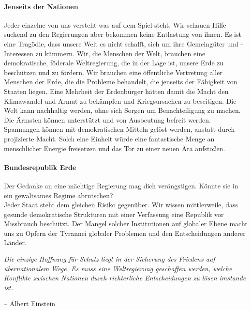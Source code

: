 \documentclass[11pt,a4paper]{article}
\begin{document}
\begin{multicols}{2}

\paragraph{Jenseits der Nationen} 

Jeder einzelne von uns versteht was auf dem Spiel steht.
Wir schauen Hilfe suchend zu den Regierungen aber bekommen keine Entlastung von ihnen.
Es ist eine Tragödie, dass unsere Welt es nicht schafft, sich um ihre Gemeingüter und -Interessen zu kümmern.
Wir, die Menschen der Welt, brauchen eine demokratische, föderale Weltregierung, die in der Lage ist, unsere Erde zu beschützen und zu fördern.
\noindent Wir brauchen eine öffentliche Vertretung aller Menschen der Erde, die die Probleme behandelt, die jenseits der Fähigkeit von Staaten liegen.
Eine Mehrheit der Erdenbürger hätten damit die Macht den Klimawandel und Armut zu bekämpfen und Kriegsursachen zu beseitigen.
Die Welt kann nachhaltig werden, ohne sich Sorgen um Benachteiligung zu machen.
Die Ärmsten können unterstützt und von Ausbeutung befreit werden.
Spannungen können mit demokratischen Mitteln gelöst werden, anstatt durch projizierte Macht.
Solch eine Einheit würde eine fantastische Menge an menschlicher Energie freisetzen und das Tor zu einer neuen Ära aufstoßen.

\paragraph{Bundesrepublik Erde}

Der Gedanke an eine mächtige Regierung mag dich verängstigen.
Könnte sie in ein gewaltsames Regime abrutschen?\\
\noindent Jeder Staat steht dem gleichen Risiko gegenüber.
Wir wissen mittlerweile, dass gesunde demokratische Strukturen mit einer Verfassung eine Republik vor Missbrauch beschützt.
Der Mangel solcher Institutionen auf globaler Ebene macht uns zu Opfern der Tyrannei globaler Problemen und den Entscheidungen anderer Länder.

\begin{shaded*}
\noindent \textit{Die einzige Hoffnung für Schutz liegt in der Sicherung des Friedens auf übernationalem Wege. Es muss eine Weltregierung geschaffen werden, welche Konflikte zwischen Nationen durch richterliche Entscheidungen zu lösen imstande ist.}
\begin{flushright}
-- Albert Einstein
\end{flushright}
\vspace{-12pt}
\end{shaded*}


\end{multicols}
\end{document}
